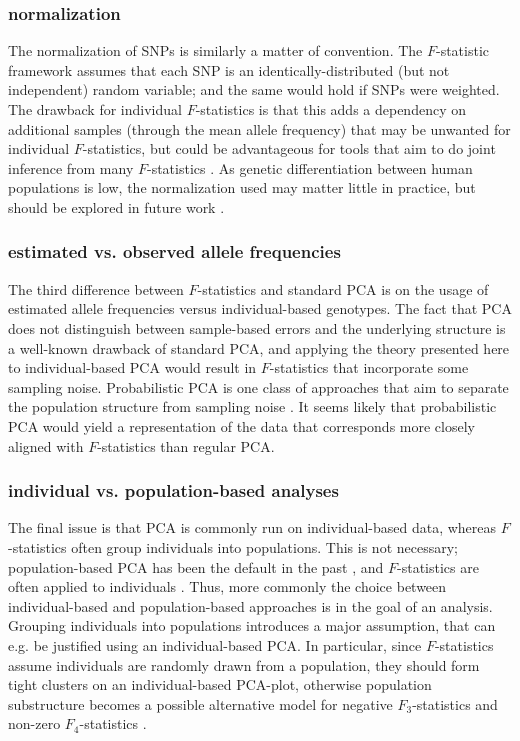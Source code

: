 \documentclass[12pt,fullpage, a4paper]{article}
\begin{document}
\subsubsection{normalization}
The normalization of SNPs is similarly a matter of convention. The $F$-statistic framework assumes that each SNP is an identically-distributed (but not independent) random variable; and the same would hold if SNPs were weighted. The drawback for individual $F$-statistics is that this adds a dependency on additional samples (through the mean allele frequency) that may be unwanted for individual $F$-statistics, but could be advantageous for tools that aim to do joint inference from  many $F$-statistics \citep{patterson2012, harney2021}. As genetic differentiation between human populations is low, the  normalization used may matter little in practice, but should be explored in future work \citep{felsenstein1973}. 


\subsubsection{estimated vs. observed allele frequencies}
The third difference between $F$-statistics and standard  PCA is on the usage of estimated allele frequencies versus individual-based genotypes. The fact that PCA does not distinguish between sample-based errors and the underlying structure is a well-known drawback of standard PCA, and applying the theory presented here to individual-based PCA would result in $F$-statistics that incorporate some sampling noise. Probabilistic PCA is one class of approaches that aim to separate the population structure from sampling noise \citep[e.g.][]{agrawal2020}. It seems likely that probabilistic PCA would yield a representation of the data that corresponds more closely aligned with $F$-statistics than regular PCA.


\subsubsection{individual vs. population-based analyses}
The final issue is that PCA is commonly run on individual-based data, whereas $F$-statistics often group individuals into populations. This is not necessary; population-based PCA has been the default in the past \citep{cavalli-sforza1994}, and $F$-statistics are often applied to individuals \citep[e.g.][]{green2010, massilani2020, yang2020}. Thus, more commonly the choice between individual-based and population-based approaches is in the goal of an analysis. Grouping individuals into populations introduces a major assumption, that can e.g. be justified using an individual-based PCA. In particular, since $F$-statistics assume individuals are randomly drawn from a population, they should form tight clusters on an individual-based PCA-plot, otherwise population substructure becomes a possible alternative model for negative $F_3$-statistics and non-zero $F_4$-statistics \citep{peter2016}.
\end{document}
